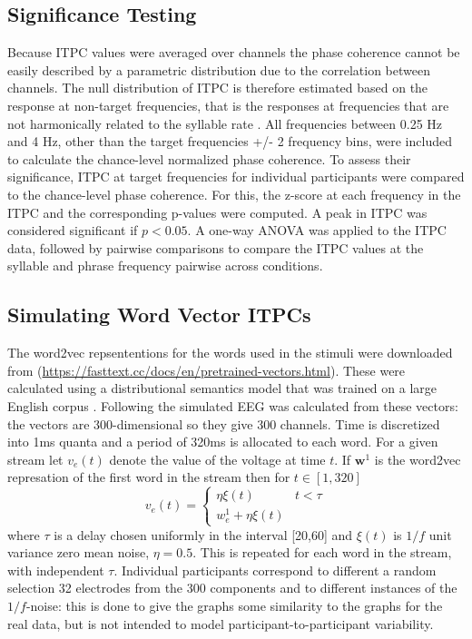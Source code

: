 \documentclass[10pt,letterpaper]{article}
\newcommand{\citet}[1]{\cite{#1}}
\begin{document}
\subsection*{Significance Testing}

Because ITPC values were averaged over channels the phase coherence
cannot be easily described by a parametric distribution due to the
correlation between channels. The null distribution of ITPC is
therefore estimated based on the response at non-target frequencies,
that is the responses at frequencies that are not harmonically related
to the syllable rate \cite{DingEtAl2017}. All frequencies between 0.25
Hz and 4 Hz, other than the target frequencies +/- 2 frequency bins,
were included to calculate the chance-level normalized phase
coherence. To assess their significance, ITPC at target frequencies
for individual participants were compared to the chance-level phase
coherence. For this, the z-score at each frequency in the ITPC and the
corresponding p-values were computed. A peak in ITPC was considered
significant if $p < 0.05$. A one-way ANOVA was applied to the ITPC
data, followed by pairwise comparisons to compare the ITPC values at
the syllable and phrase frequency pairwise across conditions.


\subsection*{Simulating Word Vector ITPCs}

The word2vec repsententions for the words used in the stimuli were
downloaded from
(\url{https://fasttext.cc/docs/en/pretrained-vectors.html}). These
were calculated using a distributional semantics model that was
trained on a large English corpus \citet{Bojanowski2017}. Following
\cite{FrankYang2018} the simulated EEG was calculated from these
vectors: the vectors are 300-dimensional so they give 300 channels.
Time is discretized into 1ms quanta and a period of 320ms is allocated
to each word. For a given stream let $v_e(t)$ denote the value of the
voltage at time $t$. If $\textbf{w}^1$ is the word2vec represation of
the first word in the stream then for $t\in [1,320]$
\begin{equation}
  v_e(t)=\left\{\begin{array}{ll}\eta\xi(t)&t<\tau\\ w^1_e+\eta\xi(t)\end{array}\right.
\end{equation}
where $\tau$ is a delay chosen uniformly in the interval [20,60] and
$\xi(t)$ is $1/f$ unit variance zero mean noise, $\eta=0.5$. This is
repeated for each word in the stream, with independent
$\tau$. Individual participants correspond to different a random
selection 32 electrodes from the 300 components and to different
instances of the $1/f$-noise: this is done to give the graphs some
similarity to the graphs for the real data, but is not intended to
model participant-to-participant variability.
\end{document}
